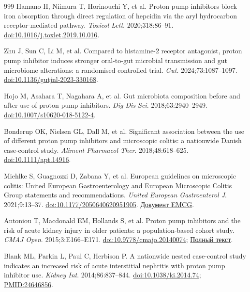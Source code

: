 \documentclass[11pt,a4paper,notitlepage]{report}
\begin{document}
\begin{thebibliography}{999}
 Hamano H, Niimura T, Horinouchi Y, et al. Proton pump inhibitors block iron absorption through direct regulation of hepcidin via the aryl hydrocarbon receptor-mediated pathway. \textit{Toxicol Lett}. 2020;318:86--91. \href{https://doi.org/10.1016/j.toxlet.2019.10.016}{doi:10.1016/j.toxlet.2019.10.016}.

 Zhu J, Sun C, Li M, et al. Compared to histamine-2 receptor antagonist, proton pump inhibitor induces stronger oral-to-gut microbial transmission and gut microbiome alterations: a randomised controlled trial. \textit{Gut}. 2024;73:1087--1097. \href{https://doi.org/10.1136/gutjnl-2023-330168}{doi:10.1136/gutjnl-2023-330168}.

 Hojo M, Asahara T, Nagahara A, et al. Gut microbiota composition before and after use of proton pump inhibitors. \textit{Dig Dis Sci}. 2018;63:2940--2949. \href{https://doi.org/10.1007/s10620-018-5122-4}{doi:10.1007/s10620-018-5122-4}.

 Bonderup OK, Nielsen GL, Dall M, et al. Significant association between the use of different proton pump inhibitors and microscopic colitis: a nationwide Danish case-control study. \textit{Aliment Pharmacol Ther}. 2018;48:618--625. \href{https://doi.org/10.1111/apt.14916}{doi:10.1111/apt.14916}.

 Miehlke S, Guagnozzi D, Zabana Y, et al. European guidelines on microscopic colitis: United European Gastroenterology and European Microscopic Colitis Group statements and recommendations. \textit{United European Gastroenterol J}. 2021;9:13--37. \href{https://doi.org/10.1177/2050640620951905}{doi:10.1177/2050640620951905}. \href{https://www.emcg-ibd.eu/pdf/Guidelines.pdf}{Документ EMCG}.

 Antoniou T, Macdonald EM, Hollands S, et al. Proton pump inhibitors and the risk of acute kidney injury in older patients: a population-based cohort study. \textit{CMAJ Open}. 2015;3:E166--E171. \href{https://doi.org/10.9778/cmajo.20140074}{doi:10.9778/cmajo.20140074}; \href{https://pmc.ncbi.nlm.nih.gov/articles/PMC4571830/}{Полный текст}.

 Blank ML, Parkin L, Paul C, Herbison P. A nationwide nested case-control study indicates an increased risk of acute interstitial nephritis with proton pump inhibitor use. \textit{Kidney Int}. 2014;86:837--844. \href{https://doi.org/10.1038/ki.2014.74}{doi:10.1038/ki.2014.74}; \href{https://pubmed.ncbi.nlm.nih.gov/24646856/}{PMID:24646856}.


\end{thebibliography}
\end{document}
